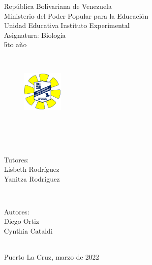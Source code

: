\begin{titlepage}
\newcommand{\HRule}{\rule{\linewidth}{0.5mm}}
\begin{center}
\normalsize República Bolivariana de Venezuela\\[0.1cm] 
\normalsize Ministerio del Poder Popular para la Educación\\[0.1cm]
\normalsize Unidad Educativa Instituto Experimental\\[0.1cm] 
\normalsize Asignatura: Biología\\[0.1cm] 
\normalsize 5to año\\[0.1cm] 
\end{center}
\center 
\quad\\[0.1cm]
\begin{figure}[h]
\centering
\includegraphics[width=2cm]{title/logo.png}
\end{figure}
\quad\\[0.1cm]
\makeatletter
{ \huge \bfseries \@title}\\[0.5cm]
\quad\\[0.9cm]

\vspace*{1cm}
\begin{minipage}{0.4\textwidth}
\begin{flushleft} \large
\normalsize{
\textup{Tutores:}\\
\textup{Lisbeth Rodríguez \\ Yanitza Rodríguez}
}
\end{flushleft}
\end{minipage}
~
\begin{minipage}{0.4\textwidth}
\begin{flushright} \large
\normalsize{
\textup{Autores:} \\
Diego Ortiz\\
Cynthia Cataldi
}
\end{flushright}
\end{minipage}\\[3cm]
\makeatother
\mbox{}
\vfill
\normalsize Puerto La Cruz, marzo de 2022
\end{titlepage}

